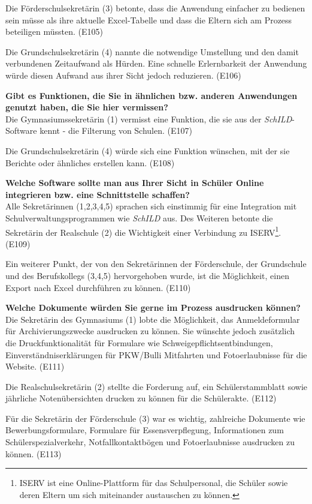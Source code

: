 Die Förderschulsekretärin (3) betonte, dass die Anwendung einfacher zu bedienen sein müsse als ihre aktuelle Excel-Tabelle und dass die Eltern sich am Prozess beteiligen müssten. (E105)

Die Grundschulsekretärin (4) nannte die notwendige Umstellung und den damit verbundenen Zeitaufwand als Hürden. Eine schnelle Erlernbarkeit der Anwendung würde diesen Aufwand aus ihrer Sicht jedoch reduzieren. (E106)

\textbf{Gibt es Funktionen, die Sie in ähnlichen bzw. anderen Anwendungen genutzt haben, die Sie hier vermissen?}\\
Die Gymnasiumssekretärin (1) vermisst eine Funktion, die sie aus der \textit{SchILD}-Software kennt - die Filterung von Schulen. (E107)

Die Grundschulsekretärin (4) würde sich eine Funktion wünschen, mit der sie Berichte oder ähnliches erstellen kann. (E108)

\textbf{Welche Software sollte man aus Ihrer Sicht in Schüler Online integrieren bzw. eine Schnittstelle schaffen?}\\
Alle Sekretärinnen (1,2,3,4,5) sprachen sich einstimmig für eine Integration mit Schulverwaltungsprogrammen wie \textit{SchILD} aus. Des Weiteren betonte die Sekretärin der Realschule (2) die Wichtigkeit einer Verbindung zu ISERV\footnote{ISERV ist eine Online-Plattform für das Schulpersonal, die Schüler sowie deren Eltern um sich miteinander austauschen zu können.}. (E109)

Ein weiterer Punkt, der von den Sekretärinnen der Förderschule, der Grundschule und des Berufskollegs (3,4,5) hervorgehoben wurde, ist die Möglichkeit, einen Export nach Excel durchführen zu können. (E110)

\textbf{Welche Dokumente würden Sie gerne im Prozess ausdrucken können?}\\
Die Sekretärin des Gymnasiums (1) lobte die Möglichkeit, das Anmeldeformular für Archivierungszwecke ausdrucken zu können. Sie wünschte jedoch zusätzlich die Druckfunktionalität für Formulare wie Schweigepflichtsentbindungen, Einverständniserklärungen für PKW/Bulli Mitfahrten und Fotoerlaubnisse für die Website. (E111)

Die Realschulsekretärin (2) stellte die Forderung auf, ein Schülerstammblatt sowie jährliche Notenübersichten drucken zu können für die Schülerakte. (E112)

Für die Sekretärin der Förderschule (3) war es wichtig, zahlreiche Dokumente wie Bewerbungsformulare, Formulare für Essensverpflegung, Informationen zum Schülerspezialverkehr, Notfallkontaktbögen und Fotoerlaubnisse ausdrucken zu können. (E113)

